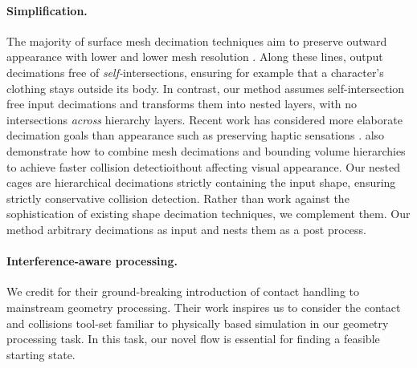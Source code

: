 
\paragraph{Simplification.}
%
The majority of surface mesh decimation techniques aim to preserve outward
appearance with lower and lower mesh resolution
\cite{Hoppe:1996:PM,Garland:1997:SSU,Melax98}.
%
Along these lines, \cite{gumhold2003intersection} output
decimations free of \emph{self-}intersections, ensuring for example that a
character's clothing stays outside its body.
%
In contrast, our method assumes self-intersection free input decimations and
transforms them into nested layers, with no intersections \emph{across}
hierarchy layers.
%
Recent work has considered more elaborate decimation goals than appearance such
as preserving haptic sensations \cite{Otaduy:2003:SPS}.
%
  also demonstrate how to combine mesh decimations and bounding
volume hierarchies to achieve faster collision detectioithout
affecting visual appearance.
%
Our nested cages are hierarchical decimations strictly containing the input
shape, ensuring strictly conservative collision detection.
%
Rather than work against the sophistication of existing shape decimation
techniques, we complement them. Our method  arbitrary decimations as input and
nests them as a post process.

\paragraph{Interference-aware processing.} We credit
\cite{ContactAwareModeling:2011} for their ground-breaking introduction of
contact handling to mainstream geometry processing. Their work inspires us to
consider the contact and collisions tool-set familiar to physically based
simulation in our geometry processing task.
%
In this task, our novel flow is essential for finding a feasible starting
state.
